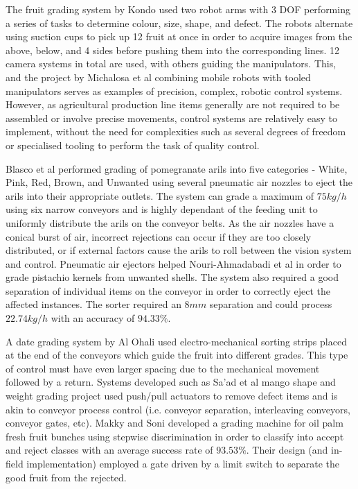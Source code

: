 \documentclass[fleqn,twoside,12pt]{report}
\begin{document}
The fruit grading system by Kondo \cite{kondo} used two robot arms with 3 DOF performing a series of tasks to determine colour, size, shape, and defect. The robots alternate using suction cups to pick up 12 fruit at once in order to acquire images from the above, below, and 4 sides before pushing them into the corresponding lines. 12 camera systems in total are used, with others guiding the manipulators. This, and the project by Michalosa et al \cite{michalosa} combining mobile robots with tooled manipulators serves as examples of precision, complex, robotic control systems. However, as agricultural production line items generally are not required to be assembled or involve precise movements, control systems are relatively easy to implement, without the need for complexities such as several degrees of freedom or specialised tooling to perform the task of quality control.  

Blasco et al \cite{blasco} performed grading of pomegranate arils into five categories - White, Pink, Red, Brown, and Unwanted using several pneumatic air nozzles to eject the arils into their appropriate outlets. The system can grade a maximum of $75kg/h$ using six narrow conveyors and is highly dependant of the feeding unit to uniformly distribute the arils on the conveyor belts. As the air nozzles have a conical burst of air, incorrect rejections can occur if they are too closely distributed, or if external factors cause the arils to roll between the vision system and control. Pneumatic air ejectors helped Nouri-Ahmadabadi et al \cite{nouri-ahmadabadi} in order to grade pistachio kernels from unwanted shells. The system also required a good separation of individual items on the conveyor in order to correctly eject the affected instances. The sorter required an $8mm$ separation and could process $22.74kg/h$ with an accuracy of $94.33\%$. 

A date grading system by Al Ohali \cite{ohali} used electro-mechanical sorting strips placed at the end of the conveyors which guide the fruit into different grades. This type of control must have even larger spacing due to the mechanical movement followed by a return. Systems developed such as Sa'ad et al \cite{saad} mango shape and weight grading project used push/pull actuators to remove defect items and is akin to conveyor process control (i.e. conveyor separation, interleaving conveyors, conveyor gates, etc). Makky and Soni \cite{makky} developed a grading machine for oil palm fresh fruit bunches using stepwise discrimination in order to classify into accept and reject classes with an average success rate of $93.53\%$. Their design (and in-field implementation) employed a gate driven by a limit switch to separate the good fruit from the rejected.
\end{document}
